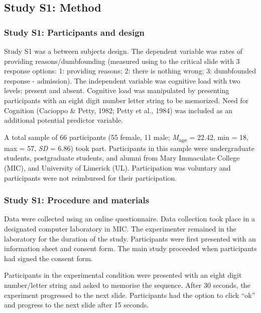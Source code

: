 \documentclass[
  american,
  man,floatsintext]{apa7}
\begin{document}
\hypertarget{study-s1-method}{%
\subsection{Study S1: Method}\label{study-s1-method}}

\hypertarget{study-s1-participants-and-design}{%
\subsubsection{Study S1: Participants and design}\label{study-s1-participants-and-design}}

Study S1 was a between subjects design. The dependent variable was rates of providing reasons/dumbfounding (measured using to the critical slide with 3 response options: 1: providing reasons; 2: there is nothing wrong; 3: dumbfounded response - admission). The independent variable was cognitive load with two levels: present and absent. Cognitive load was manipulated by presenting participants with an eight digit number letter string to be memorized. Need for Cognition (Cacioppo \& Petty, 1982; Petty et al., 1984) was included as an additional potential predictor variable.

A total sample of 66 participants (55 female, 11 male; \emph{M}\textsubscript{age} = 22.42, min = 18, max = 57, \emph{SD} = 6.86) took part. Participants in this sample were undergraduate students, postgraduate students, and alumni from Mary Immaculate College (MIC), and University of Limerick (UL). Participation was voluntary and participants were not reimbursed for their participation.

\hypertarget{study-s1-procedure-and-materials}{%
\subsubsection{Study S1: Procedure and materials}\label{study-s1-procedure-and-materials}}

Data were collected using an online questionnaire. Data collection took place in a designated computer laboratory in MIC. The experimenter remained in the laboratory for the duration of the study. Participants were first presented with an information sheet and consent form. The main study proceeded when participants had signed the consent form.

Participants in the experimental condition were presented with an eight digit number/letter string and asked to memorise the sequence. After 30 seconds, the experiment progressed to the next slide. Participants had the option to click \enquote{ok} and progress to the next slide after 15 seconds.
\end{document}
